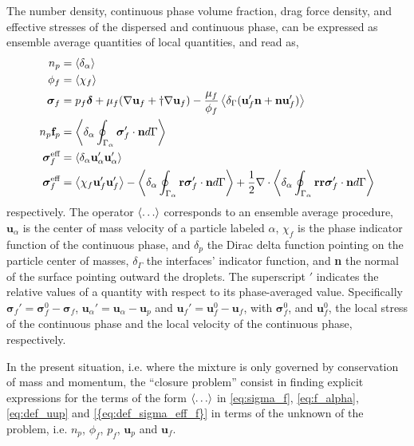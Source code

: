 The number density, continuous phase volume fraction, drag force density, and effective stresses of the dispersed and continuous phase, can be expressed as ensemble average quantities of local quantities, and read as, 
\begin{align}
    n_p &= \pavg{}
    \label{eq:n_p}\\
    \phi_f &= \avg{\chi_f}
    \label{eq:chi_f}\\
    \bm\sigma_f &= p_f \bm\delta + \mu_f (\grad \textbf{u}_f + \dagger \grad \textbf{u}_f) - \frac{\mu_f}{\phi_f} \avg{\delta_\Gamma (\textbf{u}_f' \textbf{n}+ \textbf{n}\textbf{u}_f')}
    \label{eq:sigma_f}\\
    n_p \textbf{f}_p  &= \pSavg{\bm\sigma'_f\cdot \textbf{n}}
    \label{eq:f_alpha}
    \\
    \bm{\sigma}_f^{\text{eff}} &= \pavg{\textbf{u}_\alpha'\textbf{u}_\alpha'}
    \label{eq:def_uup}
    \\
    \bm{\sigma}^{\text{eff}}_f &= \avg{\chi_f \textbf{u}_f'\textbf{u}_f'} - \pSavg{\textbf{r}\bm\sigma'_f\cdot \textbf{n}}
    + \frac{1}{2}\div\pSavg{\textbf{rr}\bm\sigma'_f\cdot \textbf{n}}
    \label{eq:def_sigma_eff_f}
\end{align}
respectively. 
The operator $\left<\ldots\right>$ corresponds to an ensemble average procedure, 
$\textbf{u}_\alpha$ is the center of mass velocity of a particle labeled $\alpha$, $\chi_f$ is the phase indicator function of the continuous phase, and $\delta_p$ the Dirac delta function pointing on the particle center of masses, $\delta_\Gamma$ the interfaces' indicator function, and \textbf{n} the normal of the surface pointing outward the droplets. 
The superscript $'$ indicates the relative values of a quantity with respect to its phase-averaged value. 
Specifically $\bm{\sigma}_f' = \bm{\sigma}_f^0  - \bm{\sigma}_f$, 
$\textbf{u}_\alpha' = \textbf{u}_\alpha - \textbf{u}_p$ and $\textbf{u}_f' = \textbf{u}_f^0  -\textbf{u}_f$, with $\bm{\sigma}_f^0 $, and $\textbf{u}_f^0$, the local stress of the continuous phase and the local velocity of the continuous phase, respectively. 

In the present situation, i.e. where the mixture is only governed by conservation of mass and momentum,  the ``closure problem'' consist in finding explicit expressions for the terms of the form $\left<\ldots\right>$ in \ref{eq:sigma_f}, \ref{eq:f_alpha}, \ref{eq:def_uup} and \ref{{eq:def_sigma_eff_f}} in terms of the unknown of the problem, i.e. $n_p$, $\phi_f$, $p_f$, $\textbf{u}_p$ and $\textbf{u}_f$. 



